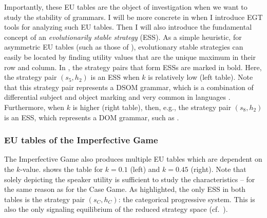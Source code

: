 \documentclass[output=paper,hidelinks]{langscibook}
\begin{document}
Importantly, these EU tables are the object of investigation when we want to study the stability of grammars. I will be more concrete in  when I introduce EGT tools for analyzing such EU tables. Then I will also introduce the fundamental concept of an \emph{evolutionarily stable strategy} (ESS). As a simple heuristic, for asymmetric EU tables (such as those of ), evolutionary stable strategies can easily be located by finding utility values that are the unique maximum in their row and column. In , the strategy pairs that form ESSs are marked in bold. Here, the strategy pair $(s_5,h_2)$ is an ESS when $k$ is relatively low (left table). Note that this strategy pair represents a DSOM grammar, which is a combination of differential subject and object marking and very common in  languages \citep[cf.][]{Dixon1994}. Furthermore, when $k$ is higher (right table), then, e.g., the strategy pair $(s_8,h_2)$ is an ESS, which represents a DOM grammar, such as .

\subsubsection{EU tables of the Imperfective Game}

The Imperfective Game also produces multiple EU tables which are dependent on the $k$-value.  shows the table for $k=0.1$ (left) and $k=0.45$ (right). Note that solely depicting the speaker utility is sufficient to study the characteristics -- for the same reason as for the Case Game. As highlighted, the only ESS in both tables is the strategy pair $(s_C, h_C)$: the categorical progressive system. This is also the only signaling equilibrium of the reduced strategy space (cf.~). 
\end{document}
